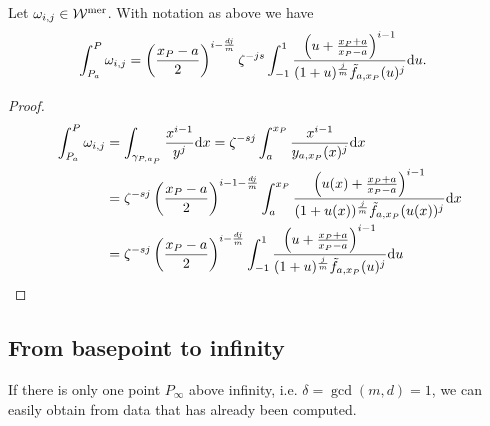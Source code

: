 \documentclass[main.tex]{subfiles}
\begin{document}
  \begin{thm}\label{thm:ajm_finite_int}
  Let $\omega_{i,j} \in \mathcal{W}^{\text{mer}}$. With notation as above we have
 \begin{align}\label{eq:aj_int}
  \begin{split}
       \int_{P_a}^P \omega_{i,j} & = \left(\frac{x_P-a}{2}\right)^{i-\frac{dj}{m}} \zeta^{-js} \int_{-1}^1
      \frac{\left(u + \frac{x_P+a}{x_P-a}\right)^{i-1}}{(1+u)^{\frac{j}{m}} \tilde{f}_{a,x_P}(u)^j}  \mathrm d u.
   \end{split}
   \end{align}
  \end{thm}
  \begin{proof}
    \begin{align}
    \begin{split}
     \int_{P_a}^P \omega_{i,j}  & =  \int_{\gamma_{P,a_P}} \frac{x^{i-1}}{y^j}  \mathrm d x  =  \zeta^{-sj} \int_a^{x_P} \frac{x^{i-1}}{y_{a,x_P}(x)^j}  \mathrm d x \\  & = 
     \zeta^{-sj} \left(\frac{x_P-a}{2}\right)^{i-1-\frac{dj}{m}}
     \int_a^{x_P} \frac{\left(u(x)+\frac{x_P+a}{x_P-a}\right)^{i-1}}{(1+u(x))^{\frac{j}{m}}\tilde{f}_{a,x_P}(u(x))^j}  \mathrm d x \\
     & =  \zeta^{-sj} \left(\frac{x_P-a}{2}\right)^{i-\frac{dj}{m}}
     \int_{-1}^{1} \frac{\left(u+\frac{x_P+a}{x_P-a}\right)^{i-1}}{(1+u)^{\frac{j}{m}}\tilde{f}_{a,x_P}(u)^j}  \mathrm d u \\
    \end{split}
  \end{align}
  \end{proof}

  \subsection{From basepoint to infinity}\label{subsec:ajm_infty}

    If there is only one point $P_{\infty}$ above infinity, i.e. $\delta = \gcd(m,d) = 1$, we can easily obtain from data that has already been computed.
\end{document}
